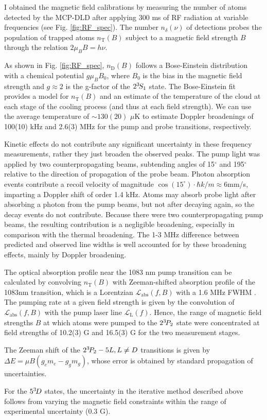 {I obtained the magnetic field calibrations by measuring the number of atoms detected by the MCP-DLD after applying 300 ms of RF radiation at variable frequencies (see Fig. \ref{fig:RF_spec}).
The number $n_\delta(\nu)$ of detections probes the population of trapped atoms $n_\text{T}(B)$ subject to a magnetic field strength $B$ through the relation $2 \mu_B B = h \nu$.
	
As shown in Fig.
	\ref{fig:RF_spec}, $n_\text{D}(B)$ follows a Bose-Einstein distribution with a chemical potential $g \mu_B B_0$, where $B_0$ is the bias in the magnetic field strength and $g\approx2$ is the g-factor of the $2^{3\!} S_1$ state.
	The Bose-Einstein fit provides a model for $n_\text{T}(B)$ and an estimate of the temperature of the cloud at each stage of the cooling process (and thus at each field strength).
	We can use the average temperature of $\sim130(20)$ $\mu$K to estimate  Doppler broadenings of 100(10) kHz and 2.6(3) MHz for the pump and probe transitions, respectively.

	Kinetic effects do not contribute any significant uncertainty in these frequency measurements, rather they just broaden the observed peaks.
	The pump light was applied by two counterpropagating beams, subtending angles of 15$^\circ$ and 195$^\circ$ relative to the direction of propagation of the probe beam.
	Photon absorption events contribute a recoil velocity of magnitude $\cos(15^\circ)\cdot\hbar k/m\approx6$mm/s, imparting a Doppler shift of order 1.4 kHz.
	Atoms may absorb probe light after absorbing a photon from the pump beams, but not after decaying again, so the decay events do not contribute.
	Because there were two counterpropagating pump beams, the resulting contribution is a negligible broadening, especially in comparison with the thermal broadening.
	The 1-3 MHz difference between predicted and observed line widths is well accounted for by these broadening effects, mainly by Doppler broadening.

	The optical absorption profile near the 1083 nm pump transition can be calculated by convolving $n_\text{T}(B)$ with Zeeman-shifted absorption profile of the 1083nm transition, which is a Lorentzian $\mathcal{L}_\text{abs}(f,B)$ with a 1.6 MHz FWHM \cite{Drake07}.
	The pumping rate at a given field strength is given by the convolution of $\mathcal{L}_\text{abs}(f,B)$ with the pump laser line $\mathcal{L}_\text{L}(f)$.
	Hence, the range of magnetic field strengths $B$ at which atoms were pumped to the $2^{3\!} P_2$ state were concentrated at field strengths of 10.2(3) G and 16.5(3) G for the two measurement stages.

	The Zeeman shift of the $2^{3\!} P_2 - 5L, L\neq D$ transitions is given by $\Delta E = \mu B (g_e m_e-g_g m_g)$, whose error is obtained by standard propagation of uncertainties.
	
	For the $5^{3\!} D$ states, the uncertainty in the iterative method described above follows from varying the magnetic field constraints within the range of experimental uncertainty ($0.3$ G). }


